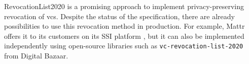    RevocationList2020 is a promising approach to implement privacy-preserving revocation of \acp{vc}. Despite the status of the specification, there are already possibilities to use this revocation method in production. For example, Mattr offers it to its customers on its SSI platform \cite{mattr_adding_2020}, but it can also be implemented independently using open-source libraries such as \texttt{vc-revocation-list-2020} \cite{digital_bazaar_vc-revocation-list-2020_2021} from Digital Bazaar.
